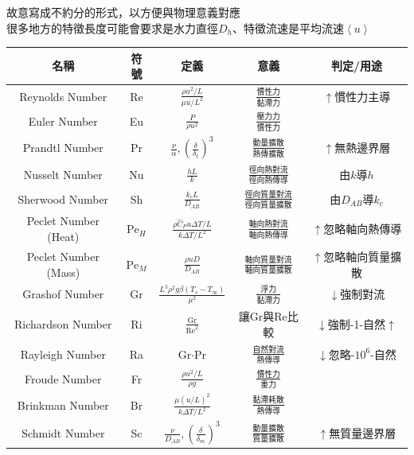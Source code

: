 \documentclass[../main.tex]{subfiles}
\begin{document}
\begin{itemize}
故意寫成不約分的形式，以方便與物理意義對應\\
很多地方的特徵長度可能會要求是水力直徑$D_h$、特徵流速是平均流速$\left<u\right>$
\renewcommand{\arraystretch}{2}
\begin{table}[H]
  \centering
  \begin{tabular}{c|c|c|c|c}
    名稱 & 符號 & 定義 & 意義 & 判定/用途\\
    \hline
    Reynolds Number & Re & $\frac{\rho u^2/L}{\mu u/L^2}$
      & $\frac{\text{慣性力}}{\text{黏滯力}}$& $\uparrow$慣性力主導\\
    Euler Number & Eu & $\frac{P}{\rho u^2}$ 
      & $\frac{\text{壓力力}}{\text{慣性力}}$& \\
    Prandtl Number & Pr & $\frac{\nu}{\alpha},\left(\frac{\delta}{\delta_t}\right)^3$ 
      & $\frac{\text{動量擴散}}{\text{熱傳擴散}}$ & $\uparrow$無熱邊界層\\
    Nusselt Number & Nu & $\frac{hL}{k}$
      & $\frac{\text{徑向熱對流}}{\text{徑向熱傳導}}$& 由$k$導$h$\\
    Sherwood Number & Sh & $\frac{k_c L}{D_{AB}}$
     & $\frac{\text{徑向質量對流}}{\text{徑向質量擴散}}$& 由$D_{AB}$導$k_c$\\
    Peclet Number (Heat) & $\text{Pe}_H$ & $\frac{\rho \hat C_P u\Delta T/L}{k\Delta T/L^2}$
      & $\frac{\text{軸向熱對流}}{\text{軸向熱傳導}}$& $\uparrow$忽略軸向熱傳導\\
    Peclet Number (Mass) & $\text{Pe}_M$ & $\frac{\rho u D}{D_{AB}}$
      & $\frac{\text{軸向質量對流}}{\text{軸向質量擴散}}$& $\uparrow$忽略軸向質量擴散\\
    Grashof Number & Gr & $\frac{L^3\rho^2g\beta\left(T_s-T_\infty\right)}{\mu^2}$
      & $\frac{\text{浮力}}{\text{黏滯力}}$ & $\downarrow$強制對流 \\
    Richardson Number & Ri & $\frac{\text{Gr}}{\text{Re}^2}$
      & {\tiny 讓Gr與Re比較} & $\downarrow$強制-1-自然$\uparrow$ \\
    Rayleigh Number & Ra & $\text{Gr}\cdot \text{Pr}$
      & $\frac{\text{自然對流}}{\text{熱傳導}}$ & $\downarrow$忽略-$10^6$-自然\\
    Froude Number & Fr & $\frac{\rho u^2/L}{\rho g}$ 
      & $\frac{\text{慣性力}}{\text{重力}}$&\\
    Brinkman Number & Br & $\frac{\mu (u/L)^2}{k\Delta T/L^2}$ 
      & $\frac{\text{黏滯耗散}}{\text{熱傳導}}$&\\
    Schmidt Number & Sc & $\frac{\nu}{D_{AB}},\left(\frac{\delta}{\delta_m}\right)^3$
      & $\frac{\text{動量擴散}}{\text{質量擴散}}$& $\uparrow$無質量邊界層\\

\end{tabular}
\end{table}
\end{itemize}
\end{document}
